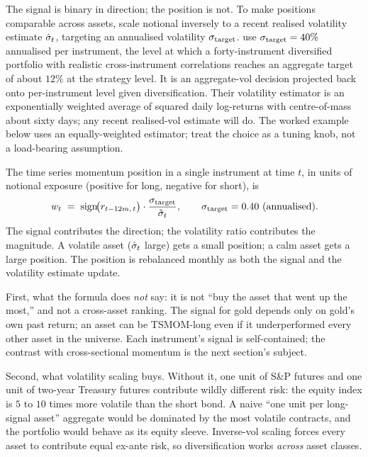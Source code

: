 The signal is binary in direction; the position is not. To make
positions comparable across assets, scale notional inversely to a
recent realised volatility estimate $\hat{\sigma}_t$, targeting an
annualised volatility $\sigma_{\text{target}}$. \citeMOP{} use
$\sigma_{\text{target}} = 40\%$ annualised per instrument, the
level at which a forty-instrument diversified portfolio with
realistic cross-instrument correlations reaches an aggregate target
of about $12\%$ at the strategy level. It is an aggregate-vol
decision projected back onto per-instrument level given
diversification. Their volatility estimator is an exponentially
weighted average of squared daily log-returns with centre-of-mass
about sixty days; any recent realised-vol estimate will do. The
worked example below uses an equally-weighted estimator; treat
the choice as a tuning knob, not a load-bearing assumption.

\begin{keyfactbox}
\label{kf:tsmom_formula}
The time series momentum position in a single instrument at
time $t$, in units of notional exposure (positive for long,
negative for short), is
\begin{equation}
  w_t \;=\; \operatorname{sign}\!\bigl(r_{t-12m,\,t}\bigr)
  \cdot \frac{\sigma_{\text{target}}}{\hat{\sigma}_t},
  \qquad \sigma_{\text{target}} = 0.40 \text{ (annualised).}
  \label{eq:tsmom_position}
\end{equation}
The signal contributes the direction; the volatility ratio
contributes the magnitude. A volatile asset
($\hat{\sigma}_t$ large) gets a small position; a calm asset
gets a large position. The position is rebalanced monthly as
both the signal and the volatility estimate update.
\end{keyfactbox}

First, what the formula does \emph{not} say: it is not ``buy the
asset that went up the most,'' and not a cross-asset ranking. The
signal for gold depends only on gold's own past return; an asset
can be TSMOM-long even if it underperformed every other asset in
the universe. Each instrument's signal is self-contained; the
contrast with cross-sectional momentum is the next section's
subject.

Second, what volatility scaling buys. Without it, one unit of S\&P
futures and one unit of two-year Treasury futures contribute
wildly different risk: the equity index is $5$ to $10$ times
more volatile than the short bond. A naive ``one unit per
long-signal asset'' aggregate would be dominated by the most
volatile contracts, and the portfolio would behave as its equity
sleeve. Inverse-vol scaling forces every asset to contribute equal
ex-ante risk, so diversification works \emph{across} asset
classes.

